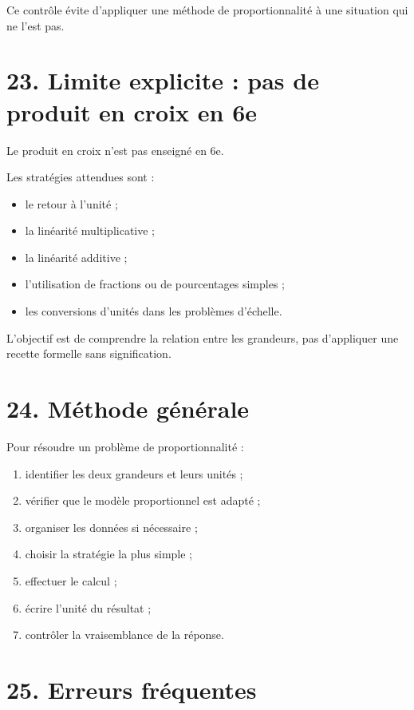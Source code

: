 Ce contrôle évite d'appliquer une méthode de proportionnalité à une situation qui ne l'est pas.

\section{23. Limite explicite : pas de produit en croix en 6e}

\begin{attention}
Le produit en croix n'est pas enseigné en 6e.
\end{attention}

Les stratégies attendues sont :
\begin{itemize}
\item le retour à l'unité ;
\item la linéarité multiplicative ;
\item la linéarité additive ;
\item l'utilisation de fractions ou de pourcentages simples ;
\item les conversions d'unités dans les problèmes d'échelle.
\end{itemize}

L'objectif est de comprendre la relation entre les grandeurs, pas d'appliquer une recette formelle sans signification.

\section{24. Méthode générale}

\begin{methode}
Pour résoudre un problème de proportionnalité :
\begin{enumerate}
\item identifier les deux grandeurs et leurs unités ;
\item vérifier que le modèle proportionnel est adapté ;
\item organiser les données si nécessaire ;
\item choisir la stratégie la plus simple ;
\item effectuer le calcul ;
\item écrire l'unité du résultat ;
\item contrôler la vraisemblance de la réponse.
\end{enumerate}
\end{methode}

\section{25. Erreurs fréquentes}

